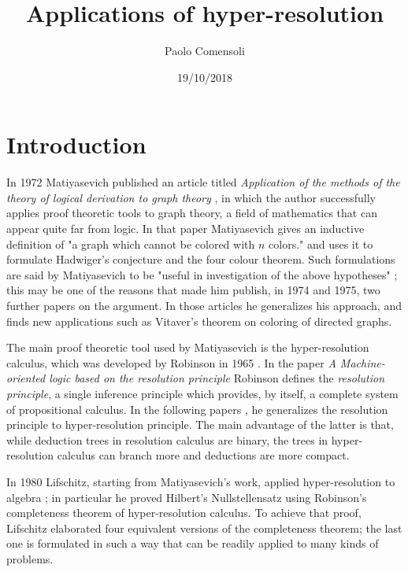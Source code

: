 \documentclass[a4paper,12pt,oneside]{book}
\title{Applications of hyper-resolution}
\author{Paolo Comensoli}
\date{19/10/2018}
\begin{document}
 

%



\setlength{\parskip}{-0.7mm} 
\setcounter{page}{1}
\tableofcontents
\thispagestyle{empty}
\newpage
\setlength{\parskip}{1mm} 



\chapter*{Introduction} %

In 1972 Matiyasevich published an article titled \textit{Application of the methods of the theory of logical derivation to graph theory} \cite{mat-2}, in which the author successfully applies proof theoretic tools to graph theory, a field of mathematics that can appear quite far from logic. 
In that paper Matiyasevich  gives an inductive definition of "a graph which cannot be colored with $n$ colors." and uses it to formulate  Hadwiger's conjecture and the four colour theorem. 
Such formulations are said by  Matiyasevich to be "useful in investigation of the above hypotheses" \cite{mat-2}; this may be one of the reasons that made him publish, in 1974 and 1975, two further papers \cite{mat-3,mat-1} on the argument.
 In those articles he generalizes his approach, and finds new applications such as Vitaver's theorem on coloring of directed graphs.

The main proof theoretic tool used by Matiyasevich is the hyper-resolution calculus, which was developed by Robinson in 1965 \cite{robinson,rob,robinson-general}. 
In the paper \textit{A Machine-oriented logic based on the resolution principle} \cite{robinson} Robinson defines the \textit{resolution principle}, a single inference principle which provides, by itself, a complete system of propositional calculus.  
In the following papers  \cite{rob,robinson-general}, he generalizes the resolution principle to hyper-resolution principle. 
The main advantage of the latter  is that, while deduction trees in resolution calculus are binary, the trees in hyper-resolution calculus can branch more  and deductions are more compact.


\newpage\vspace*{1mm}
In 1980 Lifschitz, starting from Matiyasevich's work, applied hyper-resolution to algebra \cite{lifschitz}; in particular he proved Hilbert's Nullstellensatz using Robinson's completeness theorem of hyper-resolution calculus. 
To achieve that proof, Lifschitz elaborated four equivalent versions of the completeness theorem; the last one is formulated in such a way that can be readily applied to many kinds of problems.
\end{document}
